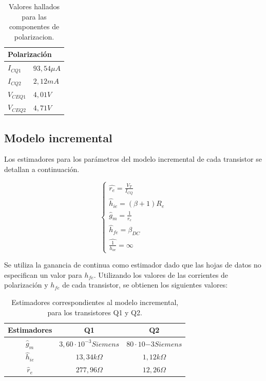 \begin{table}[H]
	\centering
\begin{tabular}{ll}
\multicolumn{2}{l}{Polarización} \\ \hline
$I_{CQ1}$          & $93,54\mu A$       \\
$I_{CQ2}$        & $2,12mA$        \\
$V_{CEQ1}$         & $4,01V$       \\
$V_{CEQ2}$         & $4,71V$      
\end{tabular}
\caption{Valores hallados para las componentes de polarizacion.}
\label{tabla_valores_polarizacion}  
\end{table}


	\subsection{Modelo incremental}
	
	Los estimadores para los parámetros del modelo incremental de cada transistor se detallan a continuación.

		\begin{equation}
			\begin{cases}
			\widehat{r_{e}}=\frac{V_{T}}{I_{CQ}}\\
			{\widehat{h}_{ie}}=(\beta+1)R_{e}\\	
			{\widehat{g}_m}=\frac{1}{r_{e}}\\
			{\widehat{h}_{fe}}= \beta_{DC}\\
			\widehat{\frac{1}{h_{oe}}}= \infty
			\end{cases}
			\label{mod_inc_ecs}
		\end{equation}
		
	Se utiliza la ganancia de continua como estimador dado que las hojas de datos no especifican un valor para $h_{fe}$. Utilizando los valores de las corrientes de polarización y $h_{fe}$ de cada transistor, se obtienen los siguientes valores:
	

	\begin{table}[h!]
		\centering
		\begin{tabular}{c c c}%
			\bfseries Estimadores & Q1 & Q2 \\ \hline
			$\widehat{g}_m$ & $3,60\cdot 10^{-3}Siemens$  & $80\cdot 10{-3}Siemens$ \\
			$\widehat{h}_{ie}$ & $13,34k\Omega$ &$1,12k\Omega$ \\
			$\widehat{r}_{e}$& $277,96\Omega$ &$12,26\Omega$ \\
			\hline
		\end{tabular}
		\caption{Estimadores correspondientes al modelo incremental, para los transistores Q1 y Q2.}
		\label{avolf}
	\end{table}
	
